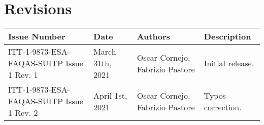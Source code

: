 
\section*{Revisions}
\label{sec:revisions}

\setlength\LTleft{0pt}
\setlength\LTright{0pt}
\scriptsize 
\begin{longtable}{|p{2cm}|p{2cm}|p{2cm}|p{7cm}|@{}}
\label{table:codeoperators} \\
\hline
\textbf{Issue Number}&\textbf{Date}&\textbf{Authors}&\textbf{Description}\\
\hline
ITT-1-9873-ESA-FAQAS-SUITP
Issue 1 Rev. 1&
March 31th, 2021&
Oscar Cornejo, Fabrizio Pastore&
\begin{minipage}{8cm}
Initial release.
\end{minipage}
\\
\hline
ITT-1-9873-ESA-FAQAS-SUITP
Issue 1 Rev. 2&
April 1st, 2021&
Oscar Cornejo, Fabrizio Pastore&
\begin{minipage}{8cm}
Typos correction.
\end{minipage}
\\
\hline



                                                    
\end{longtable}
\normalsize

\clearpage